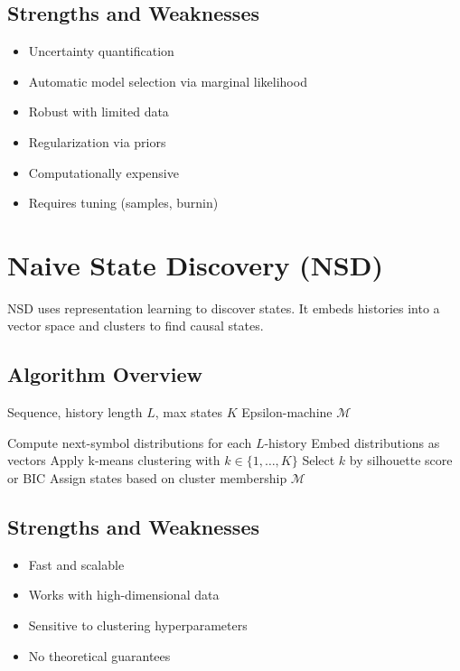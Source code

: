 \documentclass[11pt,a4paper]{report}
\theoremstyle{definition}
\theoremstyle{plain}
\begin{document}
\subsection{Strengths and Weaknesses}

\begin{itemize}
    \item[\checkmark] Uncertainty quantification
    \item[\checkmark] Automatic model selection via marginal likelihood
    \item[\checkmark] Robust with limited data
    \item[\checkmark] Regularization via priors
    \item[$\times$] Computationally expensive
    \item[$\times$] Requires tuning (samples, burnin)
\end{itemize}

\section{Naive State Discovery (NSD)}

NSD uses representation learning to discover states. It embeds histories into a vector space and clusters to find causal states.

\subsection{Algorithm Overview}

\begin{algorithm}
\caption{Naive State Discovery}
\begin{algorithmic}[1]
\Require Sequence, history length $L$, max states $K$
\Ensure Epsilon-machine $\mathcal{M}$

\State Compute next-symbol distributions for each $L$-history
\State Embed distributions as vectors
\State Apply k-means clustering with $k \in \{1, \ldots, K\}$
\State Select $k$ by silhouette score or BIC
\State Assign states based on cluster membership
\State \Return $\mathcal{M}$
\end{algorithmic}
\end{algorithm}

\subsection{Strengths and Weaknesses}

\begin{itemize}
    \item[\checkmark] Fast and scalable
    \item[\checkmark] Works with high-dimensional data
    \item[$\times$] Sensitive to clustering hyperparameters
    \item[$\times$] No theoretical guarantees
\end{itemize}
\end{document}
